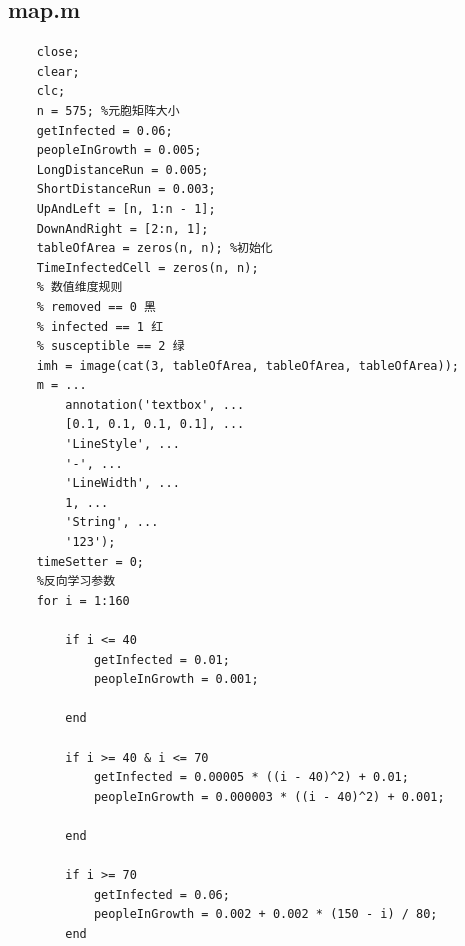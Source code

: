 \documentclass[UTF8]{ctexart}
\begin{document}
\subsection{map.m}
\begin{lstlisting}
    close;
    clear;
    clc;
    n = 575; %元胞矩阵大小
    getInfected = 0.06;
    peopleInGrowth = 0.005;
    LongDistanceRun = 0.005;
    ShortDistanceRun = 0.003;
    UpAndLeft = [n, 1:n - 1];
    DownAndRight = [2:n, 1];
    tableOfArea = zeros(n, n); %初始化
    TimeInfectedCell = zeros(n, n);
    % 数值维度规则
    % removed == 0 黑
    % infected == 1 红
    % susceptible == 2 绿
    imh = image(cat(3, tableOfArea, tableOfArea, tableOfArea));
    m = ...
        annotation('textbox', ...
        [0.1, 0.1, 0.1, 0.1], ...
        'LineStyle', ...
        '-', ...
        'LineWidth', ...
        1, ...
        'String', ...
        '123');
    timeSetter = 0;
    %反向学习参数
    for i = 1:160
    
        if i <= 40
            getInfected = 0.01;
            peopleInGrowth = 0.001;
    
        end
    
        if i >= 40 & i <= 70
            getInfected = 0.00005 * ((i - 40)^2) + 0.01;
            peopleInGrowth = 0.000003 * ((i - 40)^2) + 0.001;
    
        end
    
        if i >= 70
            getInfected = 0.06;
            peopleInGrowth = 0.002 + 0.002 * (150 - i) / 80;
        end
    

\end{lstlisting}
\end{document}
